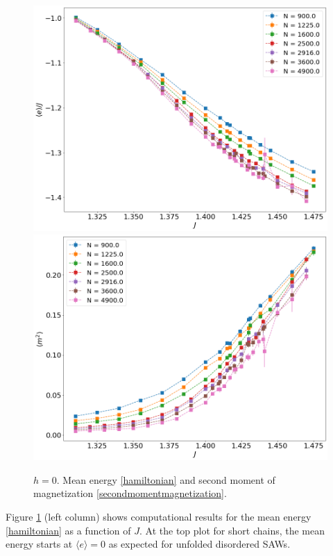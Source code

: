 \begin{figure}[t]
	\includegraphics[scale=0.23]{Images/energy_longchains.png}
	\includegraphics[scale=0.23]{Images/magnetization2_longchains.png}
	\caption{$h=0$. Mean energy \eqref{hamiltonian} and   second moment of magnetization \eqref{secondmomentmagnetization}. }
	\label{fig:energymagshort}
\end{figure}

 Figure \ref{fig:energymagshort} (left column) shows computational results for the mean energy  \eqref{hamiltonian} as a function of $J$. At the top plot for short chains, the mean energy starts at $\langle e \rangle = 0$ as expected for unfolded disordered SAWs. %
 
